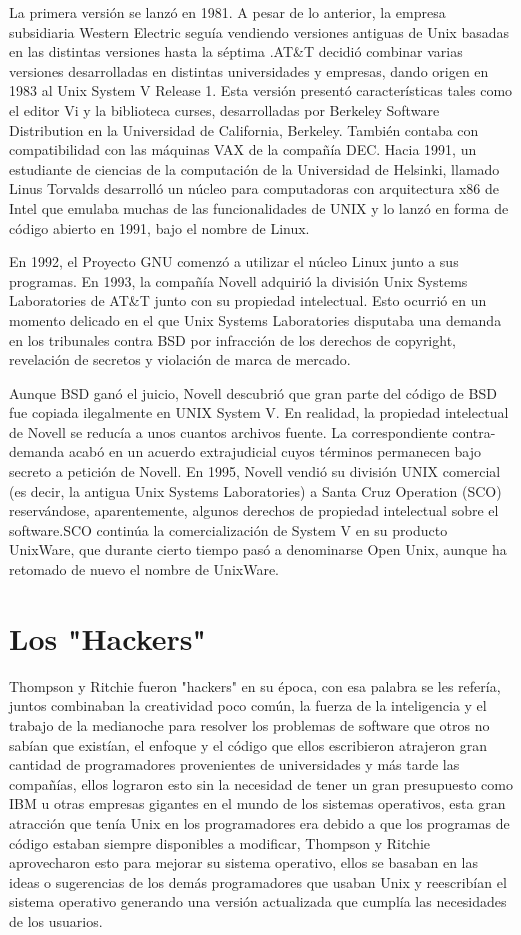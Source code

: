 La primera versión se lanzó en 1981. A pesar de lo anterior, la empresa subsidiaria Western Electric seguía vendiendo versiones antiguas de Unix basadas en las distintas 
versiones hasta la séptima .AT\&T decidió combinar varias versiones desarrolladas en distintas universidades y empresas, dando origen en 1983 al Unix System V Release 1. Esta 
versión presentó características tales como el editor Vi y la biblioteca curses, desarrolladas por Berkeley Software Distribution en la Universidad de California, Berkeley. 
También contaba con compatibilidad con las máquinas VAX de la compañía DEC. Hacia 1991, un estudiante de ciencias de la computación de la Universidad de Helsinki, llamado Linus 
Torvalds desarrolló un núcleo para computadoras con arquitectura x86 de Intel que emulaba muchas de las funcionalidades de UNIX y lo lanzó en forma de código abierto en 1991, 
bajo el nombre de Linux.
 
En 1992, el Proyecto GNU comenzó a utilizar el núcleo Linux junto a sus programas. En 1993, la compañía Novell adquirió la división Unix Systems Laboratories de AT\&T junto con 
su propiedad intelectual. Esto ocurrió en un momento delicado en el que Unix Systems Laboratories disputaba una demanda en los tribunales contra BSD por infracción de los 
derechos de copyright, revelación de secretos y violación de marca de mercado.
 
Aunque BSD ganó el juicio, Novell descubrió que gran parte del código de BSD fue copiada ilegalmente en UNIX System V. En realidad, la propiedad intelectual de Novell se reducía 
a unos cuantos archivos fuente. La correspondiente contra-demanda acabó en un acuerdo extrajudicial cuyos términos permanecen bajo secreto a petición de Novell. En 1995, Novell 
vendió su división UNIX comercial (es decir, la antigua Unix Systems Laboratories) a Santa Cruz Operation (SCO) reservándose, aparentemente, algunos derechos de propiedad 
intelectual sobre el software.SCO continúa la comercialización de System V en su producto UnixWare, que durante cierto tiempo pasó a denominarse Open Unix, aunque ha retomado de 
nuevo el nombre de UnixWare.


\section*{Los "Hackers"}
Thompson y Ritchie fueron "hackers" en su época, con esa palabra se les refería, juntos combinaban la creatividad poco común, la fuerza de la inteligencia y el trabajo de 
la medianoche para resolver los problemas de software que otros no sabían que existían, el enfoque y el código que ellos escribieron atrajeron gran cantidad de 
programadores provenientes de universidades y más tarde las  compañías, ellos lograron esto sin la necesidad de tener un gran presupuesto como IBM u otras empresas 
gigantes en el mundo de los sistemas operativos,  esta gran atracción que tenía Unix en los programadores era debido a que los programas de código estaban siempre  
disponibles a modificar, Thompson y Ritchie aprovecharon esto para mejorar su sistema operativo, ellos se basaban en las ideas o sugerencias de los demás programadores que 
usaban Unix y reescribían el sistema operativo generando una versión actualizada que cumplía las necesidades de los usuarios.



